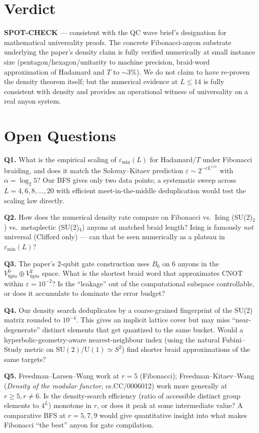 \documentclass[11pt]{article}
\begin{document}
\section{Verdict}
\textbf{SPOT-CHECK} --- consistent with the QC wave brief's designation for mathematical universality proofs. The concrete Fibonacci-anyon substrate underlying the paper's density claim is fully verified numerically at small instance size (pentagon/hexagon/unitarity to machine precision, braid-word approximation of Hadamard and $T$ to $\sim 3\%$). We do not claim to have re-proven the density theorem itself; but the numerical evidence at $L\le 14$ is fully consistent with density and provides an operational witness of universality on a real anyon system.

\section*{Open Questions}

\textbf{Q1.} What is the empirical scaling of $\varepsilon_{\min}(L)$ for Hadamard/$T$ under Fibonacci braiding, and does it match the Solovay--Kitaev prediction $\varepsilon \sim 2^{-c L^{1/\alpha}}$ with $\alpha = \log_2 5$? Our BFS gives only two data points; a systematic sweep across $L = 4, 6, 8, \ldots, 20$ with efficient meet-in-the-middle deduplication would test the scaling law directly.

\textbf{Q2.} How does the numerical density rate compare on Fibonacci vs.\ Ising (SU(2)$_2$) vs.\ metaplectic (SU(2)$_4$) anyons at matched braid length? Ising is famously \emph{not} universal (Clifford only) --- can that be seen numerically as a plateau in $\varepsilon_{\min}(L)$?

\textbf{Q3.} The paper's 2-qubit gate construction uses $B_6$ on 6 anyons in the $V^0_{6\text{pts}} \oplus V^2_{6\text{pts}}$ space. What is the shortest braid word that approximates $\mathrm{CNOT}$ within $\varepsilon = 10^{-2}$? Is the ``leakage'' out of the computational subspace controllable, or does it accumulate to dominate the error budget?

\textbf{Q4.} Our density search deduplicates by a coarse-grained fingerprint of the SU(2) matrix rounded to $10^{-4}$. This gives an implicit lattice cover but may miss ``near-degenerate'' distinct elements that get quantized to the same bucket. Would a hyperbolic-geometry-aware nearest-neighbour index (using the natural Fubini--Study metric on $\mathrm{SU}(2)/\mathrm{U}(1) \simeq S^2$) find shorter braid approximations of the same targets?

\textbf{Q5.} Freedman--Larsen--Wang work at $r = 5$ (Fibonacci); Freedman--Kitaev--Wang (\emph{Density of the modular functor}, cs.CC/0006012) work more generally at $r \ge 5, r \ne 6$. Is the density-search efficiency (ratio of accessible distinct group elements to $4^L$) monotone in $r$, or does it peak at some intermediate value? A comparative BFS at $r = 5, 7, 9$ would give quantitative insight into what makes Fibonacci ``the best'' anyon for gate compilation.
\end{document}
